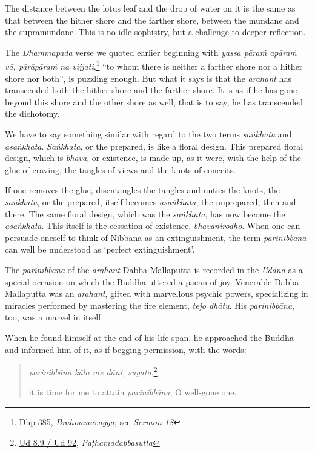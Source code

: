 The distance between the lotus leaf and the drop of water on it is the same as that between the hither shore and the farther shore, between the mundane and the supramundane. This is no idle sophistry, but a challenge to deeper reflection.

The \emph{Dhammapada} verse we quoted earlier beginning with \emph{yassa pāraṁ apāraṁ vā, pārāpāraṁ na vijjati},\footnote{\href{https://suttacentral.net/dhp383-423/pli/ms}{Dhp 385}, \emph{Brāhmaṇavagga}; see \emph{Sermon 18}} ``to whom there is neither a farther shore nor a hither shore nor both'', is puzzling enough. But what it says is that the \emph{arahant} has transcended both the hither shore and the farther shore. It is as if he has gone beyond this shore and the other shore as well, that is to say, he has transcended the dichotomy.

We have to say something similar with regard to the two terms \emph{saṅkhata} and \emph{asaṅkhata}. \emph{Saṅkhata}, or the prepared, is like a floral design. This prepared floral design, which is \emph{bhava}, or existence, is made up, as it were, with the help of the glue of craving, the tangles of views and the knots of conceits.

If one removes the glue, disentangles the tangles and unties the knots, the \emph{saṅkhata}, or the prepared, itself becomes \emph{asaṅkhata}, the unprepared, then and there. The same floral design, which was the \emph{saṅkhata}, has now become the \emph{asaṅkhata}. This itself is the cessation of existence, \emph{bhavanirodho}. When one can persuade oneself to think of Nibbāna as an extinguishment, the term \emph{parinibbāna} can well be understood as `perfect extinguishment'.

The \emph{parinibbāna} of the \emph{arahant} Dabba Mallaputta is recorded in the \emph{Udāna} as a special occasion on which the Buddha uttered a paean of joy. Venerable Dabba Mallaputta was an \emph{arahant}, gifted with marvellous psychic powers, specializing in miracles performed by mastering the fire element, \emph{tejo dhātu}. His \emph{parinibbāna}, too, was a marvel in itself.

When he found himself at the end of his life span, he approached the Buddha and informed him of it, as if begging permission, with the words:

\begin{quote}
\emph{parinibbāna kālo me dāni, sugata},\footnote{\href{https://suttacentral.net/ud8.9/pli/ms}{Ud 8.9 / Ud 92}, \emph{Paṭhamadabbasutta}}

it is time for me to attain \emph{parinibbāna}, O well-gone one.
\end{quote}

